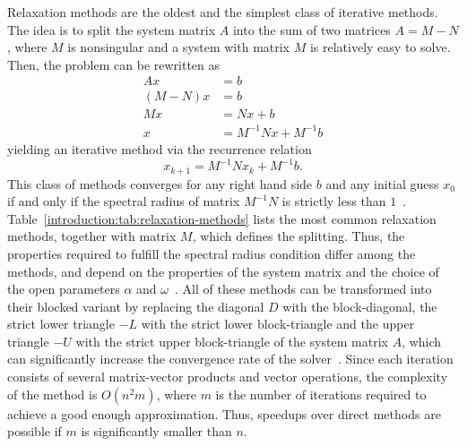Relaxation methods are the oldest and the simplest class of iterative methods.
The idea is to split the system matrix $A$ into the sum of two matrices $A = M -
N$, where $M$ is nonsingular and a system with matrix $M$ is relatively easy to
solve. Then, the problem can be rewritten as
\begin{align}
Ax &= b\\
(M - N)x &= b\\
Mx &= Nx + b \\
x &= M^{-1}Nx + M^{-1}b
\end{align}
yielding an iterative method via the recurrence relation
\begin{equation}
x_{k+1} = M^{-1}Nx_k + M^{-1}b.
\end{equation}
This class of methods converges for any right hand side $b$ and any initial
guess $x_0$  if and only if the spectral radius of matrix $M^{-1}N$ is strictly
less than $1$~\cite{demmel,saad}.
Table~\ref{introduction:tab:relaxation-methods} lists the most common
relaxation methods, together with matrix $M$, which defines the splitting.
Thus, the properties required to fulfill the spectral radius condition
differ among the methods, and depend on the properties of the system matrix
and the choice of the open parameters $\alpha$ and
$\omega$~\cite{barrettemplates}. All of these methods can be transformed into
their blocked variant by replacing the diagonal $D$ with the block-diagonal, the
strict lower triangle $-L$ with the strict lower block-triangle and the upper
triangle $-U$ with the strict upper block-triangle of the system matrix $A$,
which can significantly increase the convergence rate of the solver~\cite{saad}.
Since each iteration consists of several matrix-vector products and vector
operations, the complexity of the method is $O(n^2 m)$, where $m$ is the number
of iterations required to achieve a good enough approximation. Thus, speedups
over direct methods are possible if $m$ is significantly smaller than $n$.

